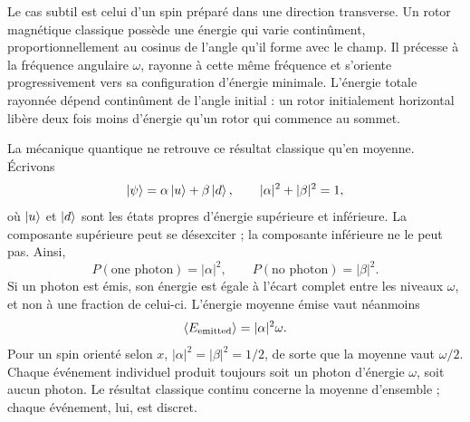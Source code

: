 Le cas subtil est celui d’un spin préparé dans une direction transverse. Un rotor magnétique classique possède une énergie qui varie continûment, proportionnellement au cosinus de l’angle qu’il forme avec le champ. Il précesse à la fréquence angulaire \(\omega\), rayonne à cette même fréquence et s’oriente progressivement vers sa configuration d’énergie minimale. L’énergie totale rayonnée dépend continûment de l’angle initial : un rotor initialement horizontal libère deux fois moins d’énergie qu’un rotor qui commence au sommet.

La mécanique quantique ne retrouve ce résultat classique qu’en moyenne. Écrivons
\begin{equation}
\left\lvert\psi\right\rangle=\alpha\left\lvert u\right\rangle+\beta\left\lvert d\right\rangle,
\qquad
|\alpha|^2+|\beta|^2=1,
\label{eq:l6-superposed-spin}
\end{equation}
où \(\left\lvert u\right\rangle\) et \(\left\lvert d\right\rangle\) sont les états propres d’énergie supérieure et inférieure. La composante supérieure peut se désexciter ; la composante inférieure ne le peut pas. Ainsi,
\begin{equation}
P(\text{one photon})=|\alpha|^2,
\qquad
P(\text{no photon})=|\beta|^2.
\end{equation}
Si un photon est émis, son énergie est égale à l’écart complet entre les niveaux \(\omega\), et non à une fraction de celui-ci. L’énergie moyenne émise vaut néanmoins
\begin{equation}
\left\langle E_{\rm emitted}\right\rangle=|\alpha|^2\omega.
\end{equation}
Pour un spin orienté selon \(x\), \(|\alpha|^2=|\beta|^2=1/2\), de sorte que la moyenne vaut \(\omega/2\). Chaque événement individuel produit toujours soit un photon d’énergie \(\omega\), soit aucun photon. Le résultat classique continu concerne la moyenne d’ensemble ; chaque événement, lui, est discret.

\begin{classroomqa}
\end{classroomqa}

